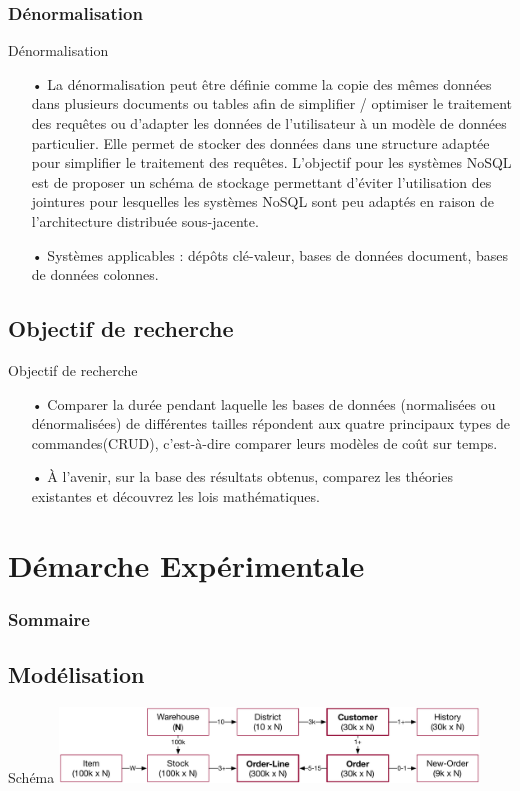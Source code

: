 \documentclass[xcolor=dvipsnames]{beamer}
\begin{document}
\begin{frame}[fragile]
	\frametitle{Dénormalisation}
	\begin{block}{Dénormalisation}
	\begin{itemize}
			\item[•] La dénormalisation peut être définie comme la copie des mêmes données dans plusieurs documents ou tables afin de simplifier / optimiser le traitement des requêtes ou d’adapter les données de l’utilisateur à un modèle de données particulier. Elle  permet de stocker des données dans une structure adaptée pour simplifier le traitement des requêtes. L’objectif pour les systèmes NoSQL est de proposer un schéma de stockage permettant d’éviter l’utilisation des jointures pour lesquelles les systèmes NoSQL sont peu adaptés en raison de l’architecture distribuée sous-jacente.
			\item[•]Systèmes applicables :  dépôts  clé-valeur, bases de données document, bases de données colonnes.
	\end{itemize}
	\end{block}
\end{frame}

\subsection{Objectif de recherche}
\begin{frame}{Objectif de recherche}
	\begin{itemize}
		\item[•] Comparer la durée pendant laquelle les bases de données (normalisées ou dénormalisées) de différentes tailles répondent aux quatre principaux types de commandes(CRUD), c'est-à-dire comparer leurs modèles de coût sur temps.
		\item[•] À l’avenir, sur la base des résultats obtenus, comparez les théories existantes et découvrez les lois mathématiques.
	\end{itemize}
\end{frame}

\section{Démarche Expérimentale}
\begin{frame}
\frametitle{Sommaire}
\tableofcontents[currentsection]
\end{frame}

\subsection{Modélisation}
\begin{frame}{Schéma}
		\includegraphics[height = 2cm]{images/TPCC.pdf}
\end{frame}
\end{document}

